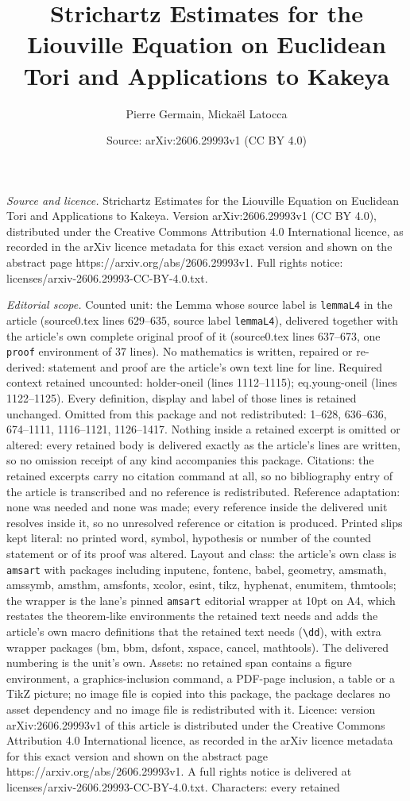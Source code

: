 \documentclass[10pt,a4paper]{amsart}
\title[Strichartz Estimates for the Liouville Equation on Euclidean]{Strichartz Estimates for the Liouville Equation on Euclidean Tori and Applications to Kakeya}
\author{Pierre Germain, Micka\"el Latocca}
\date{Source: arXiv:2606.29993v1 (CC BY 4.0)}
\begin{document}
\maketitle

\noindent\emph{Source and licence.} Strichartz Estimates for the Liouville Equation on Euclidean Tori and Applications to Kakeya. Version arXiv:2606.29993v1 (CC BY 4.0), distributed under the Creative Commons Attribution 4.0 International licence, as recorded in the arXiv licence metadata for this exact version and shown on the abstract page https://arxiv.org/abs/2606.29993v1. Full rights notice: licenses/arxiv-2606.29993-CC-BY-4.0.txt.\par\smallskip

\noindent\textit{Editorial scope.} Counted unit: the Lemma whose source label is \texttt{lemmaL4} in the article (source0.tex lines 629--635, source label \texttt{lemmaL4}), delivered together with the article's own complete original proof of it (source0.tex lines 637--673, one \texttt{proof} environment of 37 lines). No mathematics is written, repaired or re-derived: statement and proof are the article's own text line for line. Required context retained uncounted: holder-oneil (lines 1112--1115); eq.young-oneil (lines 1122--1125). Every definition, display and label of those lines is retained unchanged. Omitted from this package and not redistributed: 1--628, 636--636, 674--1111, 1116--1121, 1126--1417. Nothing inside a retained excerpt is omitted or altered: every retained body is delivered exactly as the article's lines are written, so no omission receipt of any kind accompanies this package. Citations: the retained excerpts carry no citation command at all, so no bibliography entry of the article is transcribed and no reference is redistributed. Reference adaptation: none was needed and none was made; every reference inside the delivered unit resolves inside it, so no unresolved reference or citation is produced. Printed slips kept literal: no printed word, symbol, hypothesis or number of the counted statement or of its proof was altered. Layout and class: the article's own class is \texttt{amsart} with packages including inputenc, fontenc, babel, geometry, amsmath, amssymb, amsthm, amsfonts, xcolor, esint, tikz, hyphenat, enumitem, thmtools; the wrapper is the lane's pinned \texttt{amsart} editorial wrapper at 10pt on A4, which restates the theorem-like environments the retained text needs and adds the article's own macro definitions that the retained text needs (\texttt{\textbackslash dd}), with extra wrapper packages (bm, bbm, dsfont, xspace, cancel, mathtools). The delivered numbering is the unit's own. Assets: no retained span contains a figure environment, a graphics-inclusion command, a PDF-page inclusion, a table or a TikZ picture; no image file is copied into this package, the package declares no asset dependency and no image file is redistributed with it. Licence: version arXiv:2606.29993v1 of this article is distributed under the Creative Commons Attribution 4.0 International licence, as recorded in the arXiv licence metadata for this exact version and shown on the abstract page https://arxiv.org/abs/2606.29993v1. A full rights notice is delivered at licenses/arxiv-2606.29993-CC-BY-4.0.txt. Characters: every retained 
\end{document}
